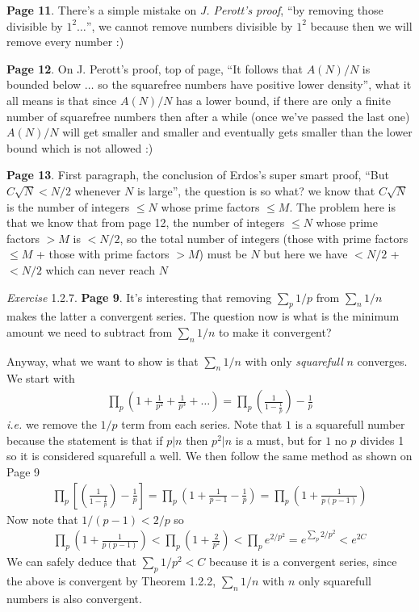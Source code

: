 \documentclass[aps,preprint,preprintnumbers,nofootinbib,showpacs,prd]{revtex4-1}
\newcommand{\ie}{{\it i.e.} }
\newcommand{\nbea}{\begin{eqnarray*}}
\newcommand{\neea}{\end{eqnarray*}}
\begin{document}
{\bf Page 11}. There's a simple mistake on {\it J. Perott's proof}, ``by removing those divisible by $1^2 \dots$'', we cannot remove numbers divisible by $1^2$ because then we will remove every number :)

{\bf Page 12}. On J. Perott's proof, top of page, ``It follows that $A(N)/N$ is bounded below $\dots$ so the squarefree numbers have positive lower density'', what it all means is that since $A(N)/N$ has a lower bound, if there are only a finite number of squarefree numbers then after a while (once we've passed the last one) $A(N)/N$ will get smaller and smaller and eventually gets smaller than the lower bound which is not allowed :)

{\bf Page 13}. First paragraph, the conclusion of Erdos's super smart proof, ``But $C\sqrt{N} < N/2$ whenever $N$ is large'', the question is so what? we know that $C\sqrt{N}$ is the number of integers $\le N$ whose prime factors $\le M$. The problem here is that we know that from page 12, the number of integers $\le N$ whose prime factors $> M$ is $< N/2$, so the total number of integers (those with prime factors $\le M$ + those with prime factors $> M$) must be $N$ but here we have $< N/2$ + $< N/2$ which can never reach $N$



{\it Exercise} 1.2.7. {\bf Page 9}. It's interesting that removing $\sum_p 1/p$ from $\sum_n 1/n$ makes the latter a convergent series. The question now is what is the minimum amount we need to subtract from $\sum_n 1/n$ to make it convergent?

Anyway, what we want to show is that $\sum_n 1/n$ with only {\it squarefull} $n$ converges. We start with
%
\nbea
\prod_p \left( 1 + \frac{1}{p^2} + \frac{1}{p^3} + \dots\right ) = \prod_p \left (\frac{1}{1 - \frac{1}{p}} \right ) - \frac{1}{p}
\neea
%
\ie we remove the $1/p$ term from each series. Note that $1$ is a squarefull number because the statement is that if $p|n$ then $p^2|n$ is a must, but for $1$ no $p$ divides 1 so it is considered squarefull a well. We then follow the same method as shown on Page 9
%
\nbea
\prod_p \left\lbrack\left (\frac{1}{1 - \frac{1}{p}} \right ) - \frac{1}{p}\right\rbrack = \prod_p \left ( 1 + \frac{1}{p-1} - \frac{1}{p} \right ) = \prod_p \left( 1 + \frac{1}{p(p-1)}\right )
\neea
%
Now note that $1/(p-1) < 2/p$ so
%
\nbea
\prod_p \left( 1 + \frac{1}{p(p-1)}\right ) < \prod_p \left( 1 + \frac{2}{p^2}\right ) < \prod_p e^{2/p^2} = e^{\sum_{p} 2/p^2} < e^{2C}
\neea
%
We can safely deduce that $\sum_p 1/p^2 < C$ because it is a convergent series, since the above is convergent by Theorem 1.2.2, $\sum_n 1/n$ with $n$ only squarefull numbers is also convergent.
\end{document}
